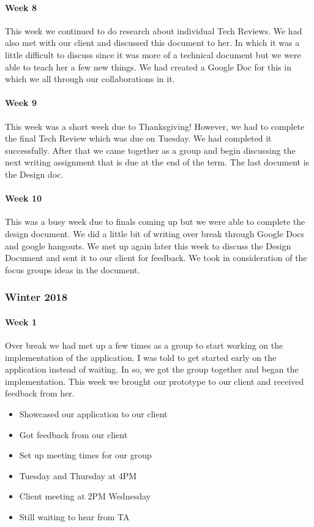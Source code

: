 \documentclass[onecolumn, draftclsnofoot,10pt, compsoc]{IEEEtran}
\begin{document}
      \paragraph{Week 8}
      This week we continued to do research about individual Tech Reviews. We had also met with our client and discussed this document to her. In which it was a little difficult to discuss since it was more of a technical document but we were able to teach her a few new things. We had created a Google Doc for this in which we all through our collaborations in it.

      \paragraph{Week 9}
      This week was a short week due to Thanksgiving! However, we had to complete the final Tech Review which was due on Tuesday. We had completed it successfully. After that we came together as a group and begin discussing the next writing assignment that is due at the end of the term. The last document is the Design doc.

      \paragraph{Week 10}
      This was a busy week due to finals coming up but we were able to complete the design document. We did a little bit of writing over break through Google Docs and google hangouts. We met up again later this week to discuss the Design Document and sent it to our client for feedback. We took in consideration of the focus groups ideas in the document.

    \subsubsection{Winter 2018}
      \paragraph{Week 1}
      Over break we had met up a few times as a group to start working on the implementation of the application. I was told to get started early on the application instead of waiting. In so, we got the group together and began the implementation. This week we brought our prototype to our client and received feedback from her.
      \begin{itemize}
        \item Showcased our application to our client
        \item Got feedback from our client
        \item Set up meeting times for our group
        \item Tuesday and Thursday at 4PM
        \item Client meeting at 2PM Wednesday
        \item Still waiting to hear from TA
      \end{itemize}
\end{document}
